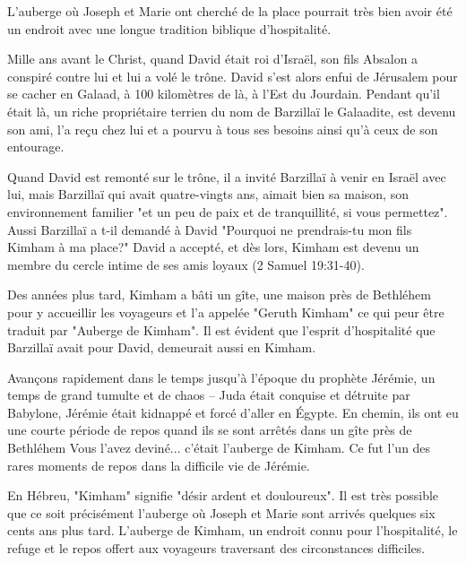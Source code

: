 
\begin{savenotes}%
\end{savenotes}

L'auberge où Joseph et Marie ont cherché de la place pourrait très bien avoir été un endroit avec une longue tradition biblique d'hospitalité.

Mille ans avant le Christ, quand David était roi d'Israël, son fils Absalon a conspiré contre lui et lui a volé le trône. David s'est alors enfui de Jérusalem pour se cacher en Galaad, à 100 kilomètres de là, à l'Est du Jourdain. Pendant qu'il était là, un riche propriétaire terrien du nom de Barzillaï le Galaadite, est devenu son ami, l'a reçu chez lui et a pourvu à tous ses besoins ainsi qu'à ceux de son entourage.

Quand David est remonté sur le trône, il a invité Barzillaï à venir en Israël avec lui, mais Barzillaï qui avait quatre-vingts ans, aimait bien sa maison, son environnement familier "et un peu de paix et de tranquillité, si vous permettez". Aussi Barzillaï a t-il demandé à David "Pourquoi ne prendrais-tu mon fils Kimham à ma place?" David a accepté, et dès lors, Kimham est devenu un membre du cercle intime de ses amis loyaux (2 Samuel 19:31-40).

Des années plus tard, Kimham a bâti un gîte, une maison près de Bethléhem pour y accueillir les voyageurs et l'a appelée "Geruth Kimham" ce qui peur être traduit par "Auberge de Kimham". Il est évident que l'esprit d'hospitalité que Barzillaï avait pour David, demeurait aussi en Kimham.

Avançons rapidement dans le temps jusqu'à l'époque du prophète Jérémie, un temps de grand tumulte et de chaos – Juda était conquise et détruite par Babylone, Jérémie était kidnappé et forcé d'aller en Égypte. En chemin, ils ont eu une courte période de repos quand ils se sont arrêtés dans un gîte près de Bethléhem Vous l'avez deviné... c'était l'auberge de Kimham. Ce fut l'un des rares moments de repos dans la difficile vie de Jérémie.

En Hébreu, "Kimham" signifie "désir ardent et douloureux". Il est très possible que ce soit précisément l'auberge où Joseph et Marie sont arrivés quelques six cents ans plus tard. L'auberge de Kimham, un endroit connu pour l'hospitalité, le refuge et le repos offert aux voyageurs traversant des circonstances difficiles.

